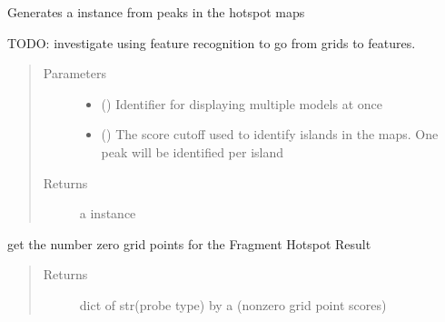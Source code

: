 \documentclass[letterpaper,10pt,english]{sphinxmanual}
\begin{document}
\begin{fulllineitems}
\begin{fulllineitems}
\end{fulllineitems}


\begin{fulllineitems}
\label{\detokenize{result_api:hotspots.result.Results.get_pharmacophore_model}}
Generates a  instance from peaks in the hotspot maps

TODO: investigate using feature recognition to go from grids to features.
\begin{quote}\begin{description}
\item[{Parameters}] \leavevmode\begin{itemize}
\item {} 
 () \textendash{} Identifier for displaying multiple models at once

\item {} 
 () \textendash{} The score cutoff used to identify islands in the maps. One peak will be identified per island

\end{itemize}

\item[{Returns}] \leavevmode
a  instance

\end{description}\end{quote}

\end{fulllineitems}


\begin{fulllineitems}
\label{\detokenize{result_api:hotspots.result.Results.map_values}}
get the number zero grid points for the Fragment Hotspot Result
\begin{quote}\begin{description}
\item[{Returns}] \leavevmode
dict of str(probe type) by a  (non\sphinxhyphen{}zero grid point scores)


\end{description}
\end{quote}
\end{fulllineitems}
\end{fulllineitems}
\end{document}
